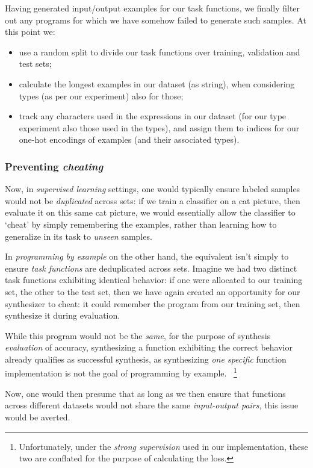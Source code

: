 \documentclass{article}
\begin{document}
Having generated input/output examples for our task functions,
we finally filter out any programs for which we have somehow failed to generate such samples.
At this point we:
\begin{itemize}
    \item use a random split to divide our task functions over training, validation and test sets;
    \item calculate the longest examples in our dataset (as string), when considering types (as per our experiment) also for those;
    \item track any characters used in the expressions in our dataset
    (for our type experiment also those used in the types),
    and assign them to indices for our one-hot encodings of examples (and their associated types).    
\end{itemize}

\subsubsection{Preventing \emph{cheating}}

Now, in \emph{supervised learning} settings,
one would typically ensure labeled samples would not be \emph{duplicated} across sets:
if we train a classifier on a cat picture,
then evaluate it on this same cat picture,
we would essentially allow the classifier to `cheat' by simply remembering the examples,
rather than learning how to generalize in its task to \emph{unseen} samples.

In \emph{programming by example} on the other hand,
the equivalent isn't simply to ensure \emph{task functions} are deduplicated across sets.
Imagine we had two distinct task functions exhibiting identical behavior:
if one were allocated to our training set,
the other to the test set,
then we have again created an opportunity for our synthesizer to cheat:
it could remember the program from our training set,
then synthesize it during evaluation.

While this program would not be the \emph{same},
for the purpose of synthesis \emph{evaluation} of accuracy,
synthesizing a function exhibiting the correct behavior already qualifies as successful synthesis,
as synthesizing \emph{one specific} function implementation is not the goal of programming by example.%
~\footnote{Unfortunately, under the \emph{strong supervision} used in our implementation, these two are conflated for the purpose of calculating the loss.}

Now, one would then presume that as long as we then ensure
that functions across different datasets
would not share the same \emph{input-output pairs},
this issue would be averted.
\end{document}

